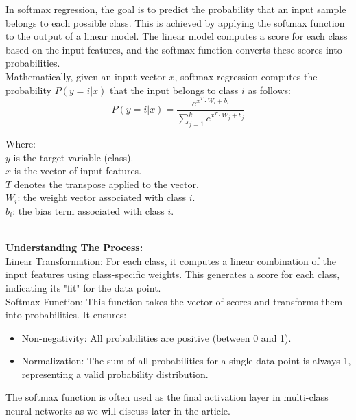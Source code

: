 \documentclass{article}
\begin{document}
In softmax regression, the goal is to predict the probability that an input sample belongs to each possible class. This is achieved by applying the softmax function to the output of a linear model. The linear model computes a score for each class based on the input features, and the softmax function converts these scores into probabilities.\\

Mathematically, given an input vector ${x}$, softmax regression computes the probability ${P(y=i | x)}$ that the input belongs to class ${i}$ as follows:
$${P(y=i | x) = \frac{e^{x^{T} \cdot W_i + b_i}}{\sum_{j=1}^{k} e^{x^{T} \cdot W_j + b_j}}
        }$$

\noindent\hspace*{10mm}
\begin{minipage}{\dimexpr\linewidth-20mm}
Where:\\
${y}$ is the target variable (class).\\
${x}$ is the vector of input features.\\
${T}$ denotes the transpose applied to the vector.\\
${W_i}$: the weight vector associated with class ${i}$.\\
${b_i}$: the bias term associated with class ${i}$.\\
\end{minipage}\\
\textbf{Understanding The Process:}\hfill\newline\\
Linear Transformation: For each class, it computes a linear combination of the input features using class-specific weights. This generates a score for each class, indicating its "fit" for the data point.\hfill\newline\\
Softmax Function: This function takes the vector of scores and transforms them into probabilities. It ensures:
\begin{itemize}
    \item Non-negativity: All probabilities are positive (between 0 and 1).
\end{itemize}
\begin{itemize}
    \item Normalization: The sum of all probabilities for a single data point is always 1, representing a valid probability distribution.
\end{itemize}
The softmax function is often used as the final activation layer in multi-class neural networks as we will discuss later in the article.
\end{document}
